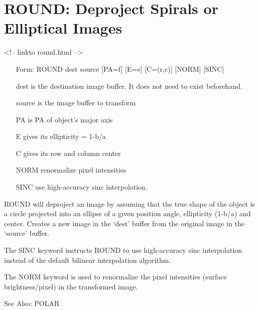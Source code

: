 \section{ROUND: Deproject Spirals or Elliptical Images}
\begin{rawhtml}
<!-- linkto round.html -->
\end{rawhtml}
\begin{itemize}
  \item[Form: ROUND dest source {[PA=f]} {[E=e]} {[C=(r,c)]} {[NORM]} 
       {[SINC]}\hfill]{}
  \item[dest]{is the destination image buffer. It does not need
       to exist beforehand.}
  \item[source]{is the image buffer to transform}
  \item[PA]{is PA of object's major axis}
  \item[E]{gives its ellipticity = 1-b/a}
  \item[C]{gives its row and column center}
  \item[NORM]{renormalize pixel intensities}
  \item[SINC]{use high-accuracy sinc interpolation.}
\end{itemize}

ROUND will deproject an image by assuming that the true shape of the object
is a circle projected into an ellipse of a given position angle,
ellipticity (1-b/a) and center.  Creates a new image in the `dest' buffer
from the original image in the `source' buffer.

The SINC keyword instructs ROUND to use high-accuracy sinc interpolation
instead of the default bilinear interpolation algorithm.  

The NORM keyword is used to renormalize the pixel intensities (surface
brightness/pixel) in the transformed image.

See Also: POLAR


